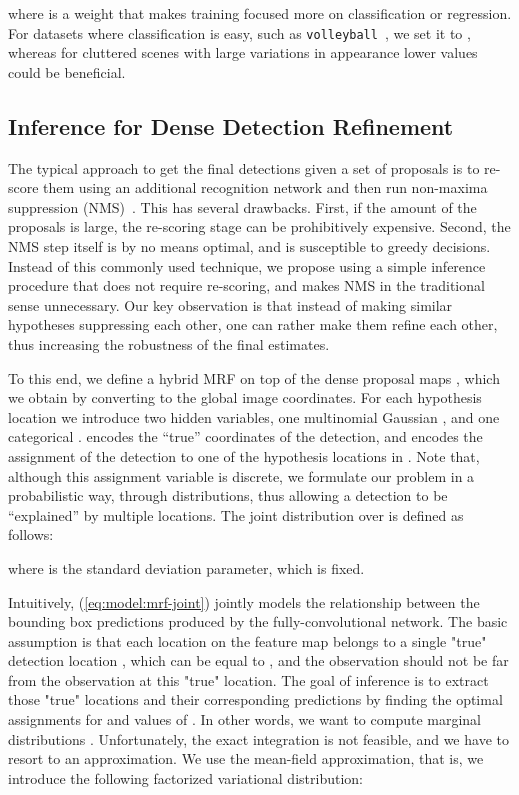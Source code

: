 \documentclass[10pt,twocolumn,letterpaper]{article}
\begin{document}
where  is a weight that makes training focused
more on classification or regression. For datasets where classification is easy,
such as \texttt{volleyball}~\cite{Ibrahim2016}, we set it to , 
whereas for cluttered scenes with large variations in appearance lower values could be
beneficial.




\subsection{Inference for Dense Detection Refinement}
\vspace{-0.15cm}
\label{sec:method:inference}

The typical approach to get the final detections given a set of proposals is to
re-score them using an additional recognition network and then run non-maxima
suppression (NMS)~\cite{Johnson2016, Ren2015}. This has several
drawbacks. First, if the amount of the proposals is large, the re-scoring stage can
be prohibitively expensive. Second, the NMS step itself is by no means optimal, and is
susceptible to greedy decisions. Instead of this commonly used technique, we
propose using a simple inference procedure that does not require re-scoring, and
makes NMS in the traditional sense unnecessary. Our key observation is that instead
of making similar hypotheses suppressing each other, one can rather make them
refine each other, thus increasing the robustness of the final estimates.

To this end, we define a hybrid MRF on top of the dense
proposal maps , which we obtain by converting  to the global image
coordinates.  For each hypothesis location  we introduce two hidden
variables, one multinomial Gaussian , and one categorical .  encodes the ``true'' coordinates of the detection, and 
encodes the assignment of the detection to one of the
hypothesis locations in . Note that, although this assignment variable is discrete,
we  formulate our problem in a probabilistic way, through distributions, thus
allowing a detection to be ``explained'' by multiple locations. The joint
distribution over  is defined as follows:

\vspace{-0.25cm}

where  is the standard deviation parameter, which is fixed.

Intuitively, (\ref{eq:model:mrf-joint}) jointly models the relationship between 
the bounding box predictions produced by the fully-convolutional network. 
The basic assumption is that each location  on the feature map 
belongs to a single "true" detection location , which can be equal to , 
and the observation  should not be far from the observation  at this "true"
location. The goal of inference is to extract those "true" locations
and their corresponding predictions by finding the optimal assignments for  and
values of . In other words, we want to compute marginal distributions
. Unfortunately, the exact integration is not
feasible, and we have to resort to an approximation. We use the mean-field approximation, 
that is, we introduce the following factorized variational distribution: 
\end{document}

